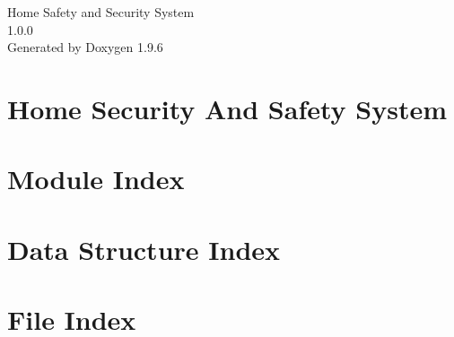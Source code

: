 \documentclass[twoside]{book}
\newcommand{\+}{\discretionary{\mbox{\scriptsize$\hookleftarrow$}}{}{}}
\newcommand{\clearemptydoublepage}{%
    \newpage{\pagestyle{empty}\cleardoublepage}%
  }
\begin{document}
  \raggedbottom
    \hypersetup{pageanchor=false,
                bookmarksnumbered=true,
                pdfencoding=unicode
               }
  \begin{titlepage}
  \vspace*{7cm}
  \begin{center}%
  {\Large Home Safety and Security System}\\
  [1ex]\large 1.\+0.\+0 \\
  \vspace*{1cm}
  {\large Generated by Doxygen 1.9.6}\\
  \end{center}
  \end{titlepage}
  \clearemptydoublepage
  \tableofcontents
  \clearemptydoublepage
  \hypersetup{pageanchor=true}
\chapter{Home Security And Safety System}
\label{index}\hypertarget{index}{}
\chapter{Module Index}

\chapter{Data Structure Index}

\chapter{File Index}

\end{document}
